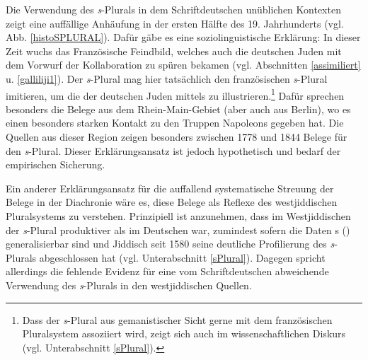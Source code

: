 Die Verwendung des \textit{s}-Plurals in dem Schriftdeutschen unüblichen Kontexten zeigt eine auffällige Anhäufung in der ersten Hälfte des 19. Jahrhunderts (vgl. Abb. \ref{histoSPLURAL}). Dafür gäbe es eine soziolinguistische Erklärung: In dieser Zeit wuchs das Französische Feindbild, welches auch die deutschen Juden mit dem Vorwurf der Kollaboration zu spüren bekamen (vgl. Abschnitten \ref{assimiliert} u. \ref{galliliji1}). Der \textit{s}-Plural mag hier tatsächlich den französischen \textit{s}-Plural imitieren, um die  der deutschen Juden mittels  zu illustrieren.\footnote{Dass der \textit{s}-Plural aus gemanistischer Sicht gerne mit dem französischen Pluralsystem assoziiert wird, zeigt sich auch im wissenschaftlichen Diskurs (vgl. Unterabschnitt \ref{sPlural}).} Dafür sprechen besonders die Belege aus dem Rhein-Main-Gebiet (aber auch aus Berlin), wo es einen besonders starken Kontakt zu den Truppen Napoleons gegeben hat. Die Quellen aus dieser Region zeigen besonders zwischen 1778 und 1844 Belege für den \textit{s}-Plural. Dieser Erklärungsansatz ist jedoch hypothetisch und bedarf der empirischen Sicherung.
 
Ein anderer Erklärungsansatz für die auffallend systematische Streuung der Belege in der Diachronie wäre es, diese Belege als Reflexe des westjiddischen Pluralsystems zu verstehen. Prinzipiell ist anzunehmen, dass im Westjiddischen der \textit{s}-Plural produktiver als im Deutschen war, zumindest sofern die Daten \citeauthor{Timm2007}s (\citeyear{Timm2007}) generalisierbar sind und Jiddisch seit 1580 seine deutliche Profilierung des \textit{s}-Plurals abgeschlossen hat (vgl. Unterabschnitt \ref{sPlural}). Dagegen spricht allerdings die fehlende Evidenz für eine vom Schriftdeutschen abweichende Verwendung des \textit{s}-Plurals in den westjiddischen Quellen.\\

